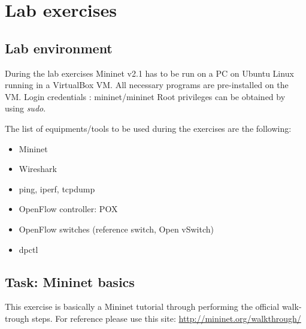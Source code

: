\documentclass{article}
\begin{document}
\section{Lab exercises}

\subsection{Lab environment}

During the lab exercises Mininet v2.1 has to be run on a PC on Ubuntu Linux running in a VirtualBox VM. All necessary
programs are pre-installed on the VM.
Login credentials : mininet/mininet
Root privileges can be obtained by using \emph{sudo}.

The list of equipments/tools to be used during the exercises are the following:
\begin{itemize}
    \item Mininet
    \item Wireshark
    \item ping, iperf, tcpdump
    \item OpenFlow controller: POX
    \item OpenFlow switches (reference switch, Open vSwitch)
    \item dpctl
\end{itemize}

\subsection{Task: Mininet basics}

This exercise is basically a Mininet tutorial through performing the official walk-trough steps. For reference please
use this site: \url{http://mininet.org/walkthrough/ }
\end{document}

